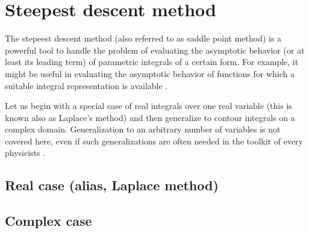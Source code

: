 \documentclass[onecolumn,a4paper,11pt]{article}
\begin{document}
\section{Steepest descent method\label{app:saddle}}
The 
stepeest descent method (also referred to as saddle point method) is a powerful tool to handle the problem of
evaluating  the
  asymptotic behavior (or at least its leading term) of parametric integrals of a certain form.
For example, it might be useful in evaluating the asymptotic behavior of functions
 for which a suitable integral representation is available
 \autocites[An introductory discussion of these topics is given, \eg,
 by][\S~11]{King.Billingham.ea:2003}[or][\S~6.]{Ablowitz.Fokas:2003}[See
 also][\S~1]{Zinn-Justin:2002}.

Let us begin with a special case of real integrals over one real variable (this
is known also as Laplace's method) and then generalize to contour integrals on
a  complex domain. Generalization to an arbitrary number of variables is not
covered here, even if such generalizations are often needed in the toolkit of
every physicists%
\autocite[Stepeest  descent method  generalizes also to
functional
integrations and path integrals, this is very important in dealing with
non-perturbative corrections in quantum mechanics and quantum field
theory. Refer to, \eg, ][]{Zinn-Justin:2002}.
\subsection{Real case (alias, Laplace method)}
\subsection{Complex case}

\printbibliography
\end{document}
